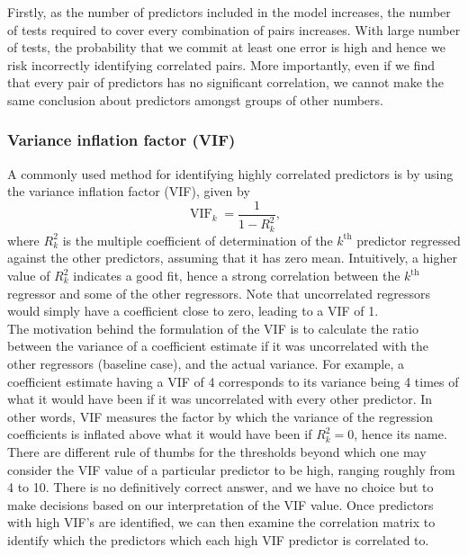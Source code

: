 \documentclass[12pt]{article}
\DeclareMathOperator{\vif}{VIF}
\begin{document}
	Firstly, as the number of predictors included in the model increases, the number of tests required to cover every combination of pairs increases. With large number of tests, the probability that we commit at least one error is high and hence we risk incorrectly identifying correlated pairs. More importantly, even if we find that every pair of predictors has no significant correlation, we cannot make the same conclusion about predictors amongst groups of other numbers. 
	
	\subsubsection{Variance inflation factor (VIF)}
	A commonly used method for identifying highly correlated predictors is by using the variance inflation factor (VIF), given by
	$$\vif_k=\frac{1}{1-R_{k}^2},$$
	where $R^2_k$ is the multiple coefficient of determination of the $k^{\text{th}}$ predictor regressed against the other predictors, assuming that it has zero mean. Intuitively, a higher value of $R^2_k$ indicates a good fit, hence a strong correlation between the $k^{\text{th}}$ regressor and some of the other regressors. Note that uncorrelated regressors would simply have a coefficient close to zero, leading to a VIF of 1.\cite{James2023}\\
	
	The motivation behind the formulation of the VIF is to calculate the ratio between the variance of a coefficient estimate if it was uncorrelated with the other regressors (baseline case), and the actual variance. For example, a coefficient estimate having a VIF of 4 corresponds to its variance being 4 times of what it would have been if it was uncorrelated with every other predictor. In other words, VIF measures the factor by which the variance of the regression coefficients is inflated above what it would have been if $R_k^2=0$, hence its name. \\
	
	There are different rule of thumbs for the thresholds beyond which one may consider the VIF value of a particular predictor to be high, ranging roughly from 4 to 10.\cite{OBrien2007} There is no definitively correct answer, and we have no choice but to make decisions based on our interpretation of the VIF value. Once predictors with high VIF's are identified, we can then examine the correlation matrix to identify which the predictors which each high VIF predictor is correlated to.
	
\end{document}

